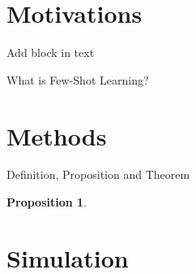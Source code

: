 \documentclass[10pt,hyperref={colorlinks,citecolor=blue,urlcolor=peking_blue,linkcolor=}]{beamer}
\theoremstyle{plain}
\newtheorem{proposition}{Proposition}
\begin{document}
\section{Motivations}

\begin{frame}{Add block in text}
\lipsum[3][1-3]

\lipsum[3][1-2]

\lipsum[3][1-4]

\begin{block}{What is Few-Shot Learning?}
    \lipsum[3][1-4]
\end{block}
\end{frame}

\section{Methods}

\begin{frame}{Definition, Proposition and Theorem}

\begin{definition}
\lipsum[3][1-4]
\end{definition}

\begin{proposition}\label{prop:1}
\lipsum[3][5-8]
\end{proposition}

\begin{theorem}\label{theorem:generalization bound}
\lipsum[3][9-12]
\end{theorem}
    
\end{frame}

\section{Simulation}
\end{document}
